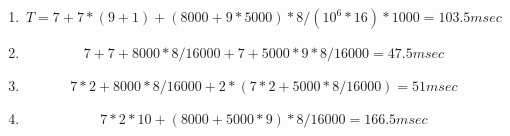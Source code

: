 \problem{}
\begin{enumerate}
	\item 
	
\begin{equation*}
T = 7 + 7*(9+1) + (8000 + 9 * 5000 )* 8 / (10^6 * 16) * 1000= 103.5 \unit{msec}
\end{equation*}
	\item
\begin{equation*}
	7 + 7 + 8000*8/16000 + 7 + 5000*9*8/16000 = 47.5 \unit{msec}
\end{equation*}
	\item
\begin{equation*}
	7 * 2 + 8000*8/16000 + 2*(7*2 + 5000*8/16000) = 51 \unit{msec}
\end{equation*}
	\item
\begin{equation*}
	7*2*10 + (8000+5000*9)*8/16000 = 166.5 \unit {msec}
\end{equation*}

\end{enumerate}